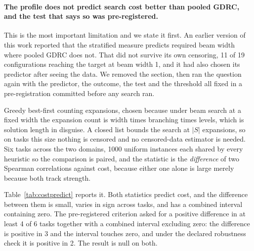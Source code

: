 \documentclass{article}
\begin{document}
\paragraph{The profile does not predict search cost better than pooled GDRC, and
the test that says so was pre-registered.} This is the most important limitation
and we state it first. An earlier version of this work reported that the
stratified measure predicts required beam width where pooled GDRC does not. That
did not survive its own censoring, 11 of 19 configurations reaching the target at
beam width 1, and it had also chosen its predictor after seeing the data. We
removed the section, then ran the question again with the predictor, the outcome,
the test and the threshold all fixed in a pre-registration committed before any
search ran.

Greedy best-first counting expansions, chosen because under beam search at a
fixed width the expansion count is width times branching times levels, which is
solution length in disguise. A closed list bounds the search at $|S|$
expansions, so on tasks this size nothing is censored and no censored-data
estimator is needed. Six tasks across the two domains, 1000 uniform instances
each shared by every heuristic so the comparison is paired, and the statistic is
the \emph{difference} of two Spearman correlations against cost, because either
one alone is large merely because both track strength.

Table~\ref{tab:costpredict} reports it. Both statistics predict cost, and the
difference between them is small, varies in sign across tasks, and has a combined
interval containing zero. The pre-registered criterion asked for a positive
difference in at least 4 of 6 tasks together with a combined interval excluding
zero: the difference is positive in 3 and the interval touches zero, and under
the declared robustness check it is positive in 2. The result is null on both.

\begin{table}[t]
\centering

\caption{Does the distance-stratified profile predict search cost better than
pooled GDRC? Correlations are against median expansions under greedy best-first,
negated so that positive means a better predictor of cheapness. Both statistics
predict cost; the difference between them does not clear the pre-registered
threshold. Design and criteria fixed in advance, before any search ran.}
\label{tab:costpredict}
\end{table}
\end{document}
